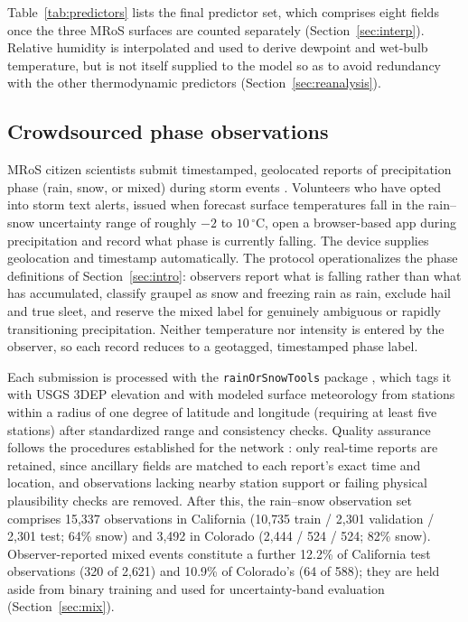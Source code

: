 \documentclass[twocol]{ametsocV6.1} %
\newcommand{\degC}[1]{\ensuremath{#1\,^{\circ}\mathrm{C}}}
\begin{document}
\noindent Table~\ref{tab:predictors} lists the final predictor set,
which comprises eight fields once the three MRoS surfaces are counted
separately (Section~\ref{sec:interp}). Relative humidity is interpolated
and used to derive dewpoint and wet-bulb temperature, but is not itself
supplied to the model so as to avoid redundancy with the other thermodynamic
predictors (Section~\ref{sec:reanalysis}).

\subsection{Crowdsourced phase observations}
MRoS citizen scientists submit timestamped, geolocated reports of
precipitation phase (rain, snow, or mixed) during storm events
\citep{arienzo2021}. Volunteers who have opted into storm text alerts,
issued when forecast surface temperatures fall in the rain--snow
uncertainty range of roughly $-2$ to \degC{10}, open a browser-based app
during precipitation and record what phase is currently falling. The
device supplies geolocation and timestamp automatically. The protocol
operationalizes the phase definitions of Section~\ref{sec:intro}:
observers report what is falling rather than what has accumulated,
classify graupel as snow and freezing rain as rain, exclude hail and true
sleet, and reserve the mixed label for genuinely ambiguous or rapidly
transitioning precipitation. Neither temperature nor intensity is entered 
by the observer, so each record reduces to a geotagged, timestamped phase label.

Each submission is processed with the \texttt{rainOrSnowTools} package
\citep{rainorsnowtools}, which tags it with USGS 3DEP elevation and with
modeled surface meteorology from stations within a radius of one degree
of latitude and longitude (requiring at least five stations) after
standardized range and consistency checks. Quality assurance follows the procedures established
for the network \citep{arienzo2021, jennings2023mros}: only real-time
reports are retained, since ancillary fields are matched to each report's
exact time and location, and observations lacking nearby station support
or failing physical plausibility checks are removed. After this, the
rain--snow observation set comprises 15{,}337 observations in
California (10{,}735 train / 2{,}301 validation / 2{,}301 test; 64\% snow)
and 3{,}492 in Colorado (2{,}444 / 524 / 524; 82\% snow).
Observer-reported mixed events constitute a further 12.2\% of California
test observations (320 of 2{,}621) and 10.9\% of Colorado's (64 of 588);
they are held aside from binary training and used for uncertainty-band
evaluation (Section~\ref{sec:mix}).
\end{document}
